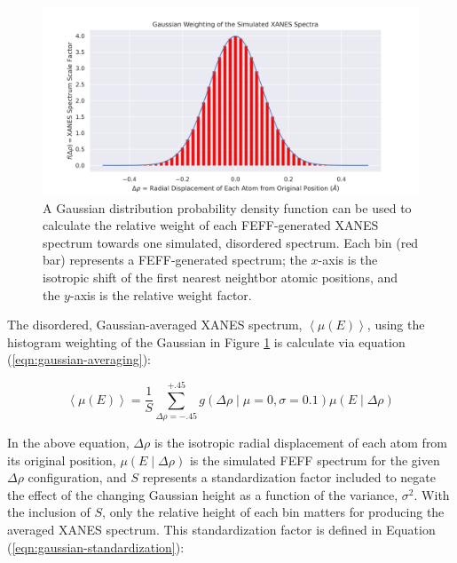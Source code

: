 \begin{figure}[h!]
	\centering
	\includegraphics[width=\linewidth]{Chapters/Figures/gaussian-weighting-hist.png}
	\caption[Simulated Spectrum Gaussian Weighting]{A Gaussian distribution probability density function can be used to calculate the relative weight of each FEFF-generated XANES spectrum towards one simulated, disordered spectrum. Each bin (red bar) represents a FEFF-generated spectrum; the $x$-axis is the isotropic shift of the first nearest neightbor atomic positions, and the $y$-axis is the relative weight factor.}
	\label{fig:gaussian-weighting-hist}
\end{figure}

The disordered, Gaussian-averaged XANES spectrum, $ \left\langle \mu(E) \right\rangle $, using the histogram weighting of the Gaussian in Figure \ref{fig:gaussian-weighting-hist} is calculate via equation (\ref{eqn:gaussian-averaging}):

\begin{equation}
	\label{eqn:gaussian-averaging}
	\left\langle \mu(E) \right\rangle  = \frac{1}{S} \sum_{\Delta\rho=-.45}^{+.45} g\left(\Delta \rho \mid \mu=0, \sigma=0.1\right) \mu(E \mid \Delta\rho)
\end{equation}

\noindent
In the above equation, $ \Delta\rho $ is the isotropic radial displacement of each atom from its original position, $\mu(E \mid \Delta\rho) $ is the simulated FEFF spectrum for the given $ \Delta\rho $ configuration, and $ S $ represents a standardization factor included to negate the effect of the changing Gaussian height as a function of the variance, $ \sigma^2 $. With the inclusion of $ S $, only the relative height of each bin matters for producing the averaged XANES spectrum. This standardization factor is defined in Equation (\ref{eqn:gaussian-standardization}):

